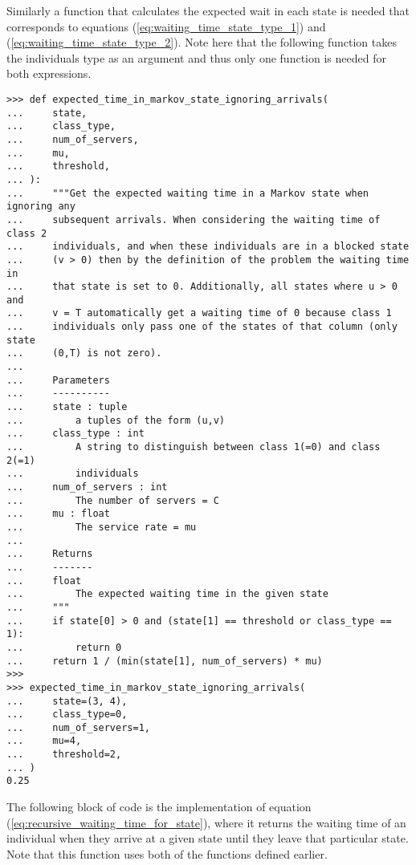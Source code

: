 Similarly a function that calculates the expected wait in each state is needed
that corresponds to equations (\ref{eq:waiting_time_state_type_1}) and
(\ref{eq:waiting_time_state_type_2}).
Note here that the following function takes the individuals type as an argument
and thus only one function is needed for both expressions.

\begin{lstlisting}[style=pystyle]
>>> def expected_time_in_markov_state_ignoring_arrivals(
...     state,
...     class_type,
...     num_of_servers,
...     mu,
...     threshold,
... ):
...     """Get the expected waiting time in a Markov state when ignoring any
...     subsequent arrivals. When considering the waiting time of class 2
...     individuals, and when these individuals are in a blocked state
...     (v > 0) then by the definition of the problem the waiting time in
...     that state is set to 0. Additionally, all states where u > 0 and
...     v = T automatically get a waiting time of 0 because class 1
...     individuals only pass one of the states of that column (only state
...     (0,T) is not zero).
... 
...     Parameters
...     ----------
...     state : tuple
...         a tuples of the form (u,v)
...     class_type : int
...         A string to distinguish between class 1(=0) and class 2(=1)
...         individuals
...     num_of_servers : int
...         The number of servers = C
...     mu : float
...         The service rate = mu
... 
...     Returns
...     -------
...     float
...         The expected waiting time in the given state
...     """
...     if state[0] > 0 and (state[1] == threshold or class_type == 1):
...         return 0
...     return 1 / (min(state[1], num_of_servers) * mu)
>>>
>>> expected_time_in_markov_state_ignoring_arrivals(
...     state=(3, 4),
...     class_type=0,
...     num_of_servers=1,
...     mu=4,
...     threshold=2,
... )
0.25

\end{lstlisting}

The following block of code is the implementation of equation
(\ref{eq:recursive_waiting_time_for_state}), where it returns the waiting time
of an individual when they arrive at a given state until they leave that
particular state.
Note that this function uses both of the functions defined earlier.


